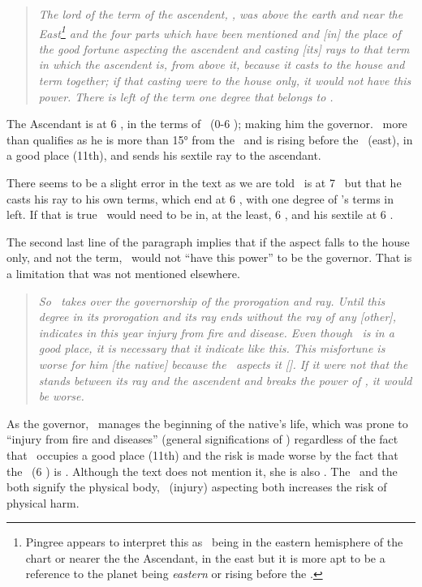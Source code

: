 \begin{quote}
\textsl{The lord of the term of the ascendent, \Mars, was above the earth and near the East\footnote{Pingree appears to interpret this as \Mars\, being in the eastern hemisphere of the chart or nearer the the Ascendant, in the east but it is more apt to be a reference to the planet being \textsl{eastern} or rising before the \Sun.} and the four parts which have been mentioned and [in] the place of the good fortune aspecting the ascendent and casting [its] rays to that term in which the ascendent is, from above it, because it casts to the house and term together; if that casting were to the house only, it would not have this power. There is left of the term one degree that belongs to \Mars.}
\end{quote}

The Ascendant is at 6 \Scorpio, in the terms of \Mars\ (0-6 \Scorpio); making him the governor. \Mars\, more than qualifies as he is more than 15° from the \Sun\, and is rising before the \Sun\, (east), in a good place (11th), and sends his sextile ray to the ascendant. 

There seems to be a slight error in the text as we are told \Mars\, is at 7 \Virgo\, but that he casts his ray to his own terms, which end at 6 \Scorpio, with one degree of \Mars's terms in \Scorpio\, left. If that is true \Mars\, would need to be in, at the least, 6 \Virgo, and his sextile at 6 \Scorpio. 

The second last line of the paragraph implies that if the aspect falls to the house only, and not the term, \Mars\, would not ``have this power'' to be the governor. That is a limitation that was not mentioned elsewhere.

\begin{quote}
\textsl{So \Mars\, takes over the governorship of the prorogation and ray. Until this degree in its prorogation and its ray ends without the ray of any [other], \Mars\, indicates in this year injury from fire and disease. Even though \Mars\, is in a good place, it is necessary that it indicate like this. This misfortune is worse for him [the native] because the \Moon\, aspects it [\Mars]. If it were not that the \Sun\, stands between its ray and the ascendent and breaks the power of \Mars, it would be worse.}
\end{quote}

As the governor, \Mars\, manages the beginning of the native's life, which was prone to ``injury from fire and diseases'' (general significations of \Mars) regardless of the fact that \Mars\, occupies a good place (11th) and the risk is made worse by the fact that the \Moon\, (6 \Cancer) is \Sextile\Mars. Although the text does not mention it, she is also \Trine\ASC. The \Moon\, and the \ASC\, both signify the physical body, \Mars\, (injury) aspecting both increases the risk of physical harm.

